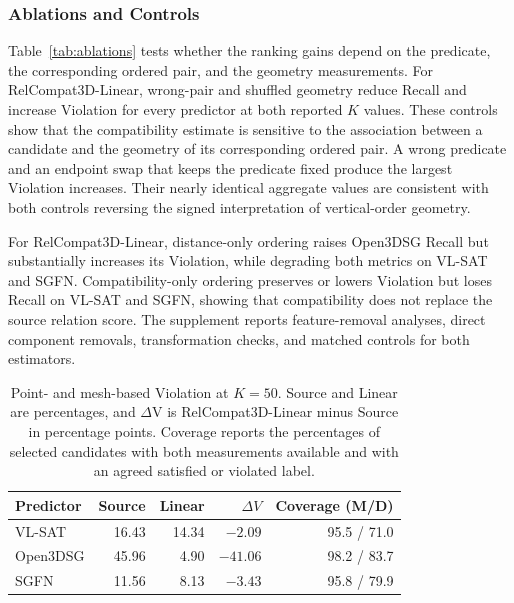 \subsubsection{Ablations and Controls}
Table~\ref{tab:ablations} tests whether the ranking gains depend on the predicate, the corresponding ordered pair, and the geometry measurements. For RelCompat3D-Linear, wrong-pair and shuffled geometry reduce Recall and increase Violation for every predictor at both reported $K$ values. These controls show that the compatibility estimate is sensitive to the association between a candidate and the geometry of its corresponding ordered pair. A wrong predicate and an endpoint swap that keeps the predicate fixed produce the largest Violation increases. Their nearly identical aggregate values are consistent with both controls reversing the signed interpretation of vertical-order geometry. 

For RelCompat3D-Linear, distance-only ordering raises Open3DSG Recall but substantially increases its Violation, while degrading both metrics on VL-SAT and SGFN. Compatibility-only ordering preserves or lowers Violation but loses Recall on VL-SAT and SGFN, showing that compatibility does not replace the source relation score.
The supplement reports feature-removal analyses, direct component removals, transformation checks, and matched controls for both estimators.

\begin{table}[t]
    \centering
    {\small
    \setlength{\tabcolsep}{1.5pt}
    \begin{tabular}{@{}lrrrr@{}}
    \toprule
    Predictor & Source & Linear & $\Delta V$ & Coverage (M/D) \\
    \midrule
    VL-SAT   & 16.43 & 14.34 & $-2.09$ & 95.5 / 71.0 \\
    Open3DSG & 45.96 & 4.90  & $-41.06$ & 98.2 / 83.7 \\
    SGFN     & 11.56 & 8.13  & $-3.43$ & 95.8 / 79.9 \\
    \bottomrule
    \end{tabular}
    }
    \caption{Point- and mesh-based Violation at $K=50$. Source and Linear are percentages, and $\Delta$V is RelCompat3D-Linear minus Source in percentage points. Coverage reports the percentages of selected candidates with both measurements available and with an agreed satisfied or violated label.}
    \label{tab:surface-audit}
\end{table}

